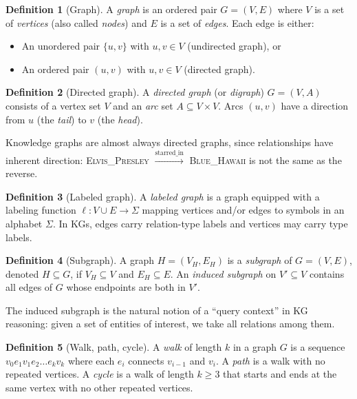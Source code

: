 \documentclass[11pt,a4paper,oneside,openany]{book}
\theoremstyle{definition}
\newtheorem{definition}{Definition}[chapter]
\theoremstyle{plain}
\theoremstyle{remark}
\begin{document}
\begin{definition}[Graph]
	A \emph{graph} is an ordered pair $G = (V, E)$ where $V$ is a set of \emph{vertices} (also called \emph{nodes}) and $E$ is a set of \emph{edges}. Each edge is either:
	\begin{itemize}
		\item An unordered pair $\{u, v\}$ with $u, v \in V$ (undirected graph), or
		\item An ordered pair $(u, v)$ with $u, v \in V$ (directed graph).
	\end{itemize}
\end{definition}

\begin{definition}[Directed graph]
	A \emph{directed graph} (or \emph{digraph}) $G = (V, A)$ consists of a vertex set $V$ and an \emph{arc} set $A \subseteq V \times V$. Arcs $(u, v)$ have a direction from $u$ (the \emph{tail}) to $v$ (the \emph{head}).
\end{definition}

Knowledge graphs are almost always directed graphs, since relationships have inherent direction: \textsc{Elvis\_Presley} $\xrightarrow{\text{starred\_in}}$ \textsc{Blue\_Hawaii} is not the same as the reverse.

\begin{definition}[Labeled graph]
	A \emph{labeled graph} is a graph equipped with a labeling function $\ell: V \cup E \to \Sigma$ mapping vertices and/or edges to symbols in an alphabet $\Sigma$. In KGs, edges carry relation-type labels and vertices may carry type labels.
\end{definition}

\begin{definition}[Subgraph]
	A graph $H = (V_H, E_H)$ is a \emph{subgraph} of $G = (V, E)$, denoted $H \subseteq G$, if $V_H \subseteq V$ and $E_H \subseteq E$. An \emph{induced subgraph} on $V' \subseteq V$ contains all edges of $G$ whose endpoints are both in $V'$.
\end{definition}

The induced subgraph is the natural notion of a ``query context'' in KG reasoning: given a set of entities of interest, we take all relations among them.

\begin{definition}[Walk, path, cycle]
	A \emph{walk} of length $k$ in a graph $G$ is a sequence $v_0 e_1 v_1 e_2 \ldots e_k v_k$ where each $e_i$ connects $v_{i-1}$ and $v_i$. A \emph{path} is a walk with no repeated vertices. A \emph{cycle} is a walk of length $k \ge 3$ that starts and ends at the same vertex with no other repeated vertices.
\end{definition}
\end{document}
